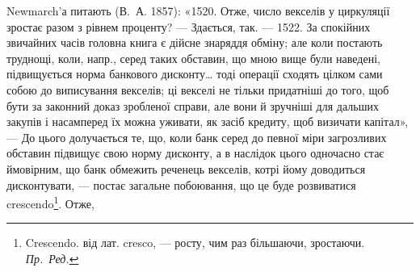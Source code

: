 Newmarch’а питають (В.~А. 1857): «1520. Отже, число векселів у циркуляції
зростає разом з рівнем проценту? — Здається, так. — 1522. За спокійних
звичайних часів головна книга є дійсне знаряддя обміну; але коли постають
труднощі, коли, напр., серед таких обставин, що мною вище були наведені, підвищується
норма банкового дисконту\dots{} тоді операції сходять цілком сами собою
до виписування векселів; ці векселі не тільки придатніші до того, щоб бути за
законний доказ зробленої справи, але вони й зручніші для дальших закупів
і насамперед їх можна уживати, як засіб кредиту, щоб визичати капітал», —
До цього долучається те, що, коли банк серед до певної міри загрозливих обставин
підвищує свою норму дисконту, а в наслідок цього одночасно стає ймовірним,
що банк обмежить реченець векселів, котрі йому доводиться дисконтувати,
— постає загальне побоювання, що це буде розвиватися crescendo\footnote{
Crescendo. від лат. cresco, — росту, чим раз більшаючи, зростаючи. \emph{Пр.~Ред.}
}. Отже,
\parbreak{}  %
